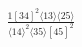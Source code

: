 \documentclass[varwidth, border=5pt]{standalone}
\begin{document}
\begin{my}
$\begin{gathered}
\scriptscriptstyle\frac{1[34]^2⟨13⟩⟨25⟩}{⟨14⟩^2⟨35⟩[45]^2}
\end{gathered}$
\end{my}
\end{document}
